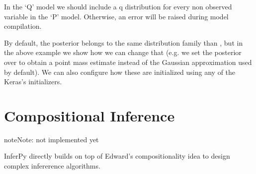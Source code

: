 \documentclass[letterpaper,10pt,english]{sphinxmanual}
\begin{document}
\begin{sphinxVerbatim}[commandchars=\\\{\}]
  
  

  \PYG{p}{[} \PYG{p}{]}

 
\end{sphinxVerbatim}

In the ‘Q’ model we should include a q distribution for every non observed variable in
the ‘P’ model. Otherwise, an error will be raised during model compilation.

By default, the posterior  belongs to the same distribution family
than  , but in the above example we show how we can change that
(e.g. we set the posterior over  to obtain a point mass estimate
instead of the Gaussian approximation used by default). We can also
configure how these  are initialized using any of the Keras’s
initializers.


\section{Compositional Inference}
\label{\detokenize{notes/guideinference:compositional-inference}}
\begin{sphinxadmonition}{note}{Note:}
not implemented yet
\end{sphinxadmonition}

InferPy directly builds on top of Edward’s compositionality idea to design complex
infererence algorithms.
\end{document}
